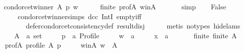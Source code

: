 \begin{isabellebody}
\ \ \isamarkupfalse%
\ {\isachardoublequoteopen}condorcet{\isacharunderscore}{\kern0pt}winner\ A\ p\ w{\isachardoublequoteclose}\isanewline
\ \ \ \ \isamarkupfalse%
\ finite\ prof{\isacharunderscore}{\kern0pt}A\ w{\isacharunderscore}{\kern0pt}in{\isacharunderscore}{\kern0pt}A\ {\isachardoublequoteopen}{}{\isachardoublequoteclose}\isanewline
\ \ \ \ \isamarkupfalse%
\ simp\isanewline
\ \ \isamarkupfalse%
\ {\isachardoublequoteopen}False{\isachardoublequoteclose}\isanewline
\ \ \ \ \isamarkupfalse%
\ {\isachardoublequoteopen}{}{\isachardoublequoteclose}\ {\isachardoublequoteopen}{}{\isachardoublequoteclose}\ condorcet{\isacharunderscore}{\kern0pt}winner{\isachardot}{\kern0pt}simps\ dcc\ IntI\ empty{\isacharunderscore}{\kern0pt}iff\isanewline
\ \ \ \ \ \ \ \ \ \ defer{\isacharunderscore}{\kern0pt}condorcet{\isacharunderscore}{\kern0pt}consistency{\isacharunderscore}{\kern0pt}def\ result{\isacharunderscore}{\kern0pt}disj\isanewline
\ \ \ \ \isamarkupfalse%
\ {\isacharparenleft}{\kern0pt}metis\ {\isacharparenleft}{\kern0pt}no{\isacharunderscore}{\kern0pt}types{\isacharcomma}{\kern0pt}\ hide{\isacharunderscore}{\kern0pt}lams{\isacharparenright}{\kern0pt}{\isacharparenright}{\kern0pt}\isanewline
{}\isamarkupfalse%
\isanewline
\ \ \isamarkupfalse%
\isanewline
\ \ \ \ A\ {\isacharcolon}{\kern0pt}{\isacharcolon}{\kern0pt}\ {\isachardoublequoteopen}{\isacharprime}{\kern0pt}a\ set{\isachardoublequoteclose}\ \isanewline
\ \ \ \ p\ {\isacharcolon}{\kern0pt}{\isacharcolon}{\kern0pt}\ {\isachardoublequoteopen}{\isacharprime}{\kern0pt}a\ Profile{\isachardoublequoteclose}\ \isanewline
\ \ \ \ w\ {\isacharcolon}{\kern0pt}{\isacharcolon}{\kern0pt}\ {\isachardoublequoteopen}{\isacharprime}{\kern0pt}a{\isachardoublequoteclose}\ \isanewline
\ \ \ \ x\ {\isacharcolon}{\kern0pt}{\isacharcolon}{\kern0pt}\ {\isachardoublequoteopen}{\isacharprime}{\kern0pt}a{\isachardoublequoteclose}\isanewline
\ \ \isamarkupfalse%
\isanewline
\ \ \ \ finite{\isacharcolon}{\kern0pt}\ {\isachardoublequoteopen}finite\ A{\isachardoublequoteclose}\ \isanewline
\ \ \ \ prof{\isacharunderscore}{\kern0pt}A{\isacharcolon}{\kern0pt}\ {\isachardoublequoteopen}profile\ A\ p{\isachardoublequoteclose}\ \isanewline
\ \ \ \ w{\isacharunderscore}{\kern0pt}in{\isacharunderscore}{\kern0pt}A{\isacharcolon}{\kern0pt}\ {\isachardoublequoteopen}w\ {\isasymin}\ A{\isachardoublequoteclose}\ \isanewline

\end{isabellebody}
